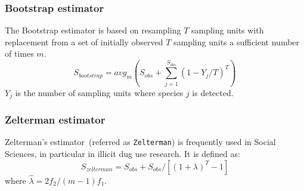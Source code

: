 \documentclass[sigconf,review,anonymous]{acmart}
\newcommand{\Zelterman}{Zelterman\xspace}
\newcommand{\Bootstrap}{Bootstrap\xspace}
\newcounter{todocounter}
\newcommand{\todo}[1]{\marginpar{$|$}\textcolor{red}{\stepcounter{todocounter}\footnote[\thetodocounter]{\textcolor{red}{\textbf{TODO }}\textit{#1}}}}
\def\<#1>{\texttt{#1}}
\renewcommand{\todo}[1]{}
\begin{document}

\subsubsection{Bootstrap estimator~\cite{smith1984nonparametric}} %
The \Bootstrap estimator
is based on resampling $T$ sampling units with replacement from a set of
initially observed $T$ sampling units a sufficient number of times $m$.
\begin{displaymath}
S_{bootstrap}  = {avg}_{m}( S_{obs} + \sum^{S_{obs}}_{j=1} (1 - Y_j/T)^T)
\end{displaymath}
$Y_{j}$ is the number of sampling units %
where species $j$ is detected. %


\subsubsection{\Zelterman estimator~\cite{bohning2010some}}
Zelterman's estimator~(referred as \<Zelterman>) is frequently used in Social Sciences, in particular in illicit dug use research.
It is defined as:
\begin{displaymath}
    S_{zelterman} = S_{obs} + S_{obs}/[(1+\lambda)^T - 1]
\end{displaymath}
where $\hat{\lambda} = 2f_2/(m-1)f_1$.
\end{document}
